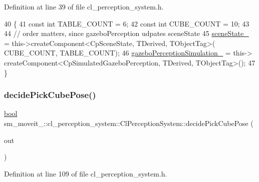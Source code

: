 Definition at line 39 of file cl\+\_\+perception\+\_\+system.\+h.


\begin{DoxyCode}
40             \{
41                 \textcolor{keyword}{const} \textcolor{keywordtype}{int} TABLE\_COUNT = 6;
42                 \textcolor{keyword}{const} \textcolor{keywordtype}{int} CUBE\_COUNT = 10;
43 
44                 \textcolor{comment}{// order matters, since gazeboPerception udpates sceneState}
45                 \hyperlink{classsm__moveit__4_1_1cl__perception__system_1_1ClPerceptionSystem_a82ea8feeb2fa43349f91ed59137b3890}{sceneState\_} = this->createComponent<CpSceneState, TDerived, TObjectTag>(
      CUBE\_COUNT, TABLE\_COUNT);
46                 \hyperlink{classsm__moveit__4_1_1cl__perception__system_1_1ClPerceptionSystem_a027c07df3f1a2cc0c30be111b27dbe5c}{gazeboPerceptionSimulation\_} = this->
      createComponent<CpSimulatedGazeboPerception, TDerived, TObjectTag>();
47             \}
\end{DoxyCode}
\mbox{\label{classsm__moveit__4_1_1cl__perception__system_1_1ClPerceptionSystem_af1143d68db667021480383673244bb04}} 
\subsubsection{\texorpdfstring{decide\+Pick\+Cube\+Pose()}{decidePickCubePose()}}
{\footnotesize\ttfamily \hyperlink{classbool}{bool} sm\+\_\+moveit\+\_\+::cl\+\_\+perception\+\_\+system\+::\+Cl\+Perception\+System\+::decide\+Pick\+Cube\+Pose (\begin{DoxyParamCaption}\item[{geometry\+\_\+msgs\+::\+Pose\+Stamped \&}]{out }\end{DoxyParamCaption})\hspace{0.3cm}{\ttfamily [inline]}}



Definition at line 109 of file cl\+\_\+perception\+\_\+system.\+h.


